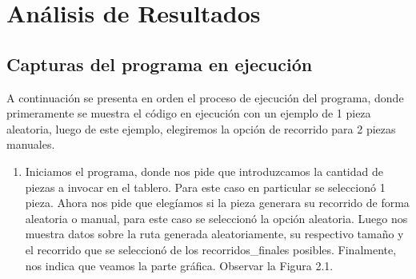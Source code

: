 \chapter{Análisis de Resultados}
\section{Capturas del programa en ejecución}

A continuación se presenta en orden el proceso de ejecución del programa, donde primeramente se muestra el código en ejecución con un ejemplo de 1 pieza aleatoria, luego de este ejemplo, elegiremos la opción de recorrido para 2 piezas manuales.\newline
\newpage

\begin{enumerate}
\item Iniciamos el programa, donde nos pide que introduzcamos la cantidad de piezas a invocar en el tablero. Para este caso en particular se seleccionó 1 pieza. Ahora nos pide que elegíamos si la pieza generara su recorrido de forma aleatoria o manual, para este caso se seleccionó la opción aleatoria. Luego nos muestra datos sobre la ruta generada aleatoriamente, su respectivo tamaño y el recorrido que se seleccionó de los recorridos\_finales posibles. Finalmente, nos indica que veamos la parte gráfica. Observar la Figura 2.1.


\end{enumerate}
